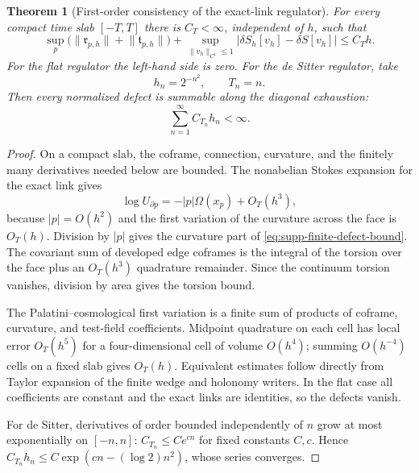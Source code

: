 \documentclass[11pt]{article}
\newtheorem{theorem}{Theorem}[section]
\numberwithin{equation}{section}
\theoremstyle{definition}
\theoremstyle{remark}
\newcommand{\norm}[1]{\lVert#1\rVert}
\newcommand{\abs}[1]{\lvert#1\rvert}
\begin{document}
\begin{theorem}[First-order consistency of the exact-link regulator]
\label{thm:supp-finite-defects}
For every compact time slab $[-T,T]$ there is $C_T<\infty$, independent of
$h$, such that
\begin{equation}
 \sup_p\bigl(\norm{\mathfrak r_{p,h}}+
\norm{\mathfrak t_{p,h}}\bigr)
 +\sup_{\norm{v_h}_{C^1}\le1}
  \abs{\delta S_h[v_h]-\delta S[v_h]}
 \le C_Th.
 \label{eq:supp-finite-defect-bound}
\end{equation}
For the flat regulator the left-hand side is zero.  For the de Sitter
regulator, take
\begin{equation}
 h_n=2^{-n^2},
 \qquad
 T_n=n.
 \label{eq:supp-diagonal-exhaustion}
\end{equation}
Then every normalized defect is summable along the diagonal exhaustion:
\begin{equation}
 \sum_{n=1}^{\infty}C_{T_n}h_n<\infty.
 \label{eq:supp-defect-summability}
\end{equation}
\end{theorem}

\begin{proof}
On a compact slab, the coframe, connection, curvature, and the finitely many
derivatives needed below are bounded.  The nonabelian Stokes expansion for the
exact link gives
\[
 \log U_{\partial p}
 =-|p|\Omega(x_p)+O_T(h^3),
\]
because $|p|=O(h^2)$ and the first variation of the curvature across the face
is $O_T(h)$.  Division by $|p|$ gives the curvature part of
\eqref{eq:supp-finite-defect-bound}.  The covariant sum of developed edge
coframes is the integral of the torsion over the face plus an $O_T(h^3)$
quadrature remainder.  Since the continuum torsion vanishes, division by area
gives the torsion bound.

The Palatini--cosmological first variation is a finite sum of products of
coframe, curvature, and test-field coefficients.  Midpoint quadrature on each
cell has local error $O_T(h^5)$ for a four-dimensional cell of volume
$O(h^4)$; summing $O(h^{-4})$ cells on a fixed slab gives $O_T(h)$.
Equivalent estimates follow directly from Taylor expansion of the finite
wedge and holonomy writers.  In the flat case all coefficients are constant
and the exact links are identities, so the defects vanish.

For de Sitter, derivatives of order bounded independently of $n$ grow at most
exponentially on $[-n,n]$: $C_{T_n}\le C e^{cn}$ for fixed constants $C,c$.
Hence
$C_{T_n}h_n\le C\exp(cn-(\log2)n^2)$, whose series converges.
\end{proof}
\end{document}
